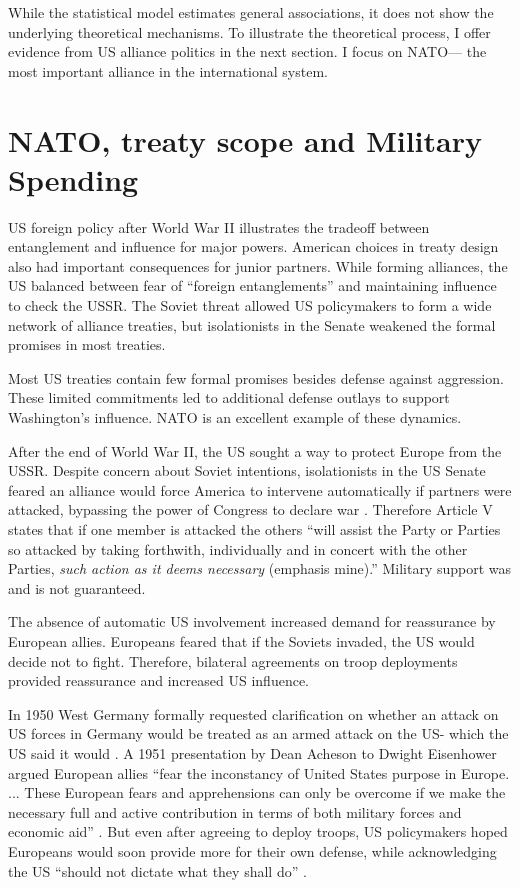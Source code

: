 \documentclass[12pt]{article}
\begin{document}
While the statistical model estimates general associations, it does not show the underlying theoretical mechanisms. 
To illustrate the theoretical process, I offer evidence from US alliance politics in the next section.  
I focus on NATO--- the most important alliance in the international system. 


\section{NATO, treaty scope and Military Spending}


US foreign policy after World War II illustrates the tradeoff between entanglement and influence for major powers.
American choices in treaty design also had important consequences for junior partners. 
While forming alliances, the US balanced between fear of ``foreign entanglements'' and maintaining influence to check the USSR.
The Soviet threat allowed US policymakers to form a wide network of alliance treaties, but isolationists in the Senate weakened the formal promises in most treaties. 


Most US treaties contain few formal promises besides defense against aggression. 
These limited commitments led to additional defense outlays to support Washington's influence.  
NATO is an excellent example of these dynamics. 


After the end of World War II, the US sought a way to protect Europe from the USSR. 
Despite concern about Soviet intentions, isolationists in the US Senate feared an alliance would force America to intervene automatically if partners were attacked, bypassing the power of Congress to declare war \citep[pg. 280-1]{Acheson1969}.
Therefore Article V states that if one member is attacked the others ``will assist the Party or Parties so attacked by taking forthwith, individually and in concert with the other Parties, \emph{such action as it deems necessary} (emphasis mine).'' 
Military support was and is not guaranteed. 


The absence of automatic US involvement increased demand for reassurance by European allies. 
Europeans feared that if the Soviets invaded, the US would decide not to fight. 
Therefore, bilateral agreements on troop deployments provided reassurance and increased US influence. 


In 1950 West Germany formally requested clarification on whether an attack on US forces in Germany would be treated as an armed attack on the US- which the US said it would \citep[pg. 395]{Acheson1969}. 
A 1951 presentation by Dean Acheson to Dwight Eisenhower argued European allies ``fear the inconstancy of United States purpose in Europe. ... These European fears and apprehensions can only be overcome if we make the necessary full and active contribution in terms of both military forces and economic aid'' \citep[pg. 3]{Acheson1951}.  
But even after agreeing to deploy troops, US policymakers hoped Europeans would soon provide more for their own defense, while acknowledging the US ``should not dictate what they shall do'' \citep[pg. 2]{Johnson1950}. 
\end{document}
